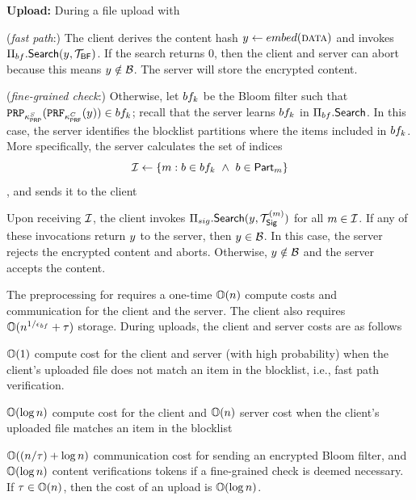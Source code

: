 \noindent\textbf{Upload:}
During a file upload with \clientData
\enumListStart
\item (\emph{fast path}:) The client derives the content hash $\genericCInputElmt \assign \embed(\clientData)$ and invokes $\bfACB.\searchBlocklist(\genericCInputElmt, \bfBlklistToken)$. If the search returns 0, then the client and server can abort because this means $\genericCInputElmt \notin \blocklist$. The server will store the encrypted content. 
\item (\emph{fine-grained check}:) Otherwise, let $\bloomFilter[\bloomFilterIdx]$ be the Bloom filter such that $\prp{\prpKeyServer}(\prf{\prfKeyClient}(\genericCInputElmt)) \in \bloomFilter[\bloomFilterIdx]$; recall that the server learns $\bloomFilter[\bloomFilterIdx]$ in $\Pi_{bf}.\mathsf{Search}$. In this case, the server identifies the blocklist partitions where the items included in $\bloomFilter[\bloomFilterIdx]$. More specifically, the server calculates the set of indices $$\partitionIDSet \assign \{ \partitionIdx: \genericBlocklistElmt \in \bloomFilter[\bloomFilterIdx] ~\land ~\genericBlocklistElmt \in \partition{\partitionIdx}\}$$, and sends it to the client 
\item Upon receiving $\mathcal{I}$, the client invokes $\sigACB.\searchBlocklist(\genericCInputElmt, \sigBlklistToken{\partitionIdx})$ for all $m \in \mathcal{I}$. If any of these invocations return $\genericCInputElmt$ to the server, then $\genericCInputElmt \in \blocklist$. In this case, the server rejects the encrypted content and aborts. Otherwise, $\genericCInputElmt \notin \blocklist$ and the server accepts the content. 
\enumListEnd

%

\itemListStart
\item The preprocessing for \bfBlklistToken requires a one-time $\mathbb{O}(n)$ compute costs and communication for the client and the server. The client also requires $\mathbb{O}(n^{1/\epsilon_{bf}} +
 \tau)$ storage. During uploads, the client and server costs are as follows
 
\item $\mathbb{O}(1)$ compute cost for the client and server (with high probability) when the client's uploaded file does not match an item in the blocklist, i.e., fast path verification.
\item $\mathbb{O}(\log n)$ compute cost for the client and $\mathbb{O}(n)$ server cost when the client's uploaded file matches an item in the blocklist
\item $\mathbb{O}((n/\tau)+ \log n)$ communication cost for sending an encrypted Bloom filter, and $\mathbb{O}(\log n)$ content verifications tokens if a fine-grained check is deemed necessary. If $\tau \in \mathbb{O}(n)$, then the cost of an upload is $\mathbb{O}(\log n)$. 
\itemListEnd

